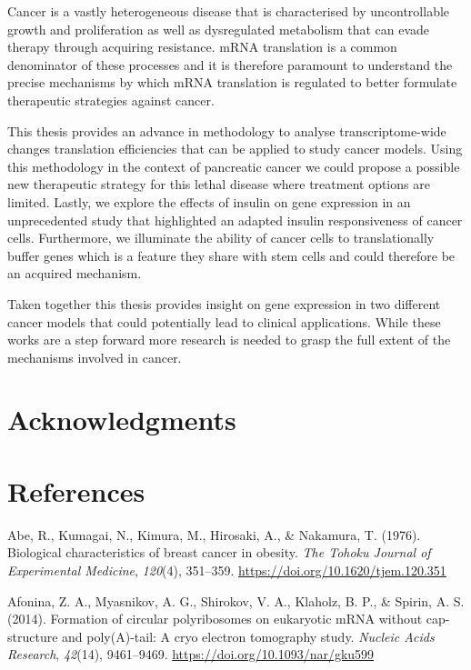 \documentclass[12pt,openany]{book}
\begin{document}
Cancer is a vastly heterogeneous disease that is characterised by
uncontrollable growth and proliferation as well as dysregulated
metabolism that can evade therapy through acquiring resistance. mRNA
translation is a common denominator of these processes and it is
therefore paramount to understand the precise mechanisms by which mRNA
translation is regulated to better formulate therapeutic strategies
against cancer.

This thesis provides an advance in methodology to analyse
transcriptome-wide changes translation efficiencies that can be applied
to study cancer models. Using this methodology in the context of
pancreatic cancer we could propose a possible new therapeutic strategy
for this lethal disease where treatment options are limited. Lastly, we
explore the effects of insulin on gene expression in an unprecedented
study that highlighted an adapted insulin responsiveness of cancer
cells. Furthermore, we illuminate the ability of cancer cells to
translationally buffer genes which is a feature they share with stem
cells and could therefore be an acquired mechanism.

Taken together this thesis provides insight on gene expression in two
different cancer models that could potentially lead to clinical
applications. While these works are a step forward more research is
needed to grasp the full extent of the mechanisms involved in cancer.

\chapter*{Acknowledgments}\label{acknowledgments}

\chapter*{References}\label{references}

\hypertarget{refs}{}
\hypertarget{ref-Abe1976}{}
Abe, R., Kumagai, N., Kimura, M., Hirosaki, A., \& Nakamura, T. (1976).
Biological characteristics of breast cancer in obesity. \emph{The Tohoku
Journal of Experimental Medicine}, \emph{120}(4), 351--359.
\url{https://doi.org/10.1620/tjem.120.351}

\hypertarget{ref-Afonina2014}{}
Afonina, Z. A., Myasnikov, A. G., Shirokov, V. A., Klaholz, B. P., \&
Spirin, A. S. (2014). Formation of circular polyribosomes on eukaryotic
mRNA without cap-structure and poly(A)-tail: A cryo electron tomography
study. \emph{Nucleic Acids Research}, \emph{42}(14), 9461--9469.
\url{https://doi.org/10.1093/nar/gku599}
\end{document}
